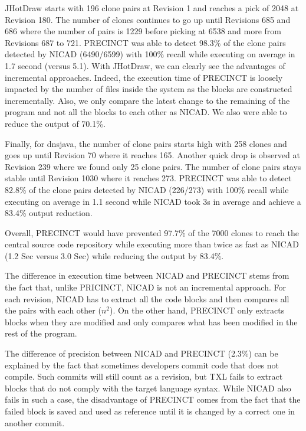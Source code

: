 \documentclass[conference]{IEEEtran}
\begin{document}
JHotDraw starts with 196 clone pairs at Revision 1 and reaches a pick of 2048 at Revision 180. The number of clones  continues to go up until Revisions 685 and 686 where the number of pairs is 1229 before picking at 6538 and more from Revisions 687 to 721.
PRECINCT was able to detect 98.3\% of the clone pairs detected by NICAD (6490/6599) with 100\% recall while executing on average in 1.7 second (versus 5.1).
With JHotDraw, we can clearly see the advantages of incremental approaches.
Indeed, the execution time of PRECINCT is loosely impacted by the number of files inside the system as the blocks are constructed incrementally.
Also, we only compare the latest change to the remaining of the program and not all the blocks to each other as NICAD.
We also were able to reduce the output of 70.1\%.

Finally, for dnsjava, the number of clone pairs starts high with 258 clones and goes up until Revision 70 where it reaches 165. Another quick drop is observed at Revision 239 where we found only 25 clone pairs. The number of clone pairs stays stable until Revision 1030 where it reaches 273. PRECINCT was able to detect 82.8\% of the clone pairs detected by NICAD (226/273) with 100\% recall while executing on average in 1.1 second while NICAD took 3s in average and achieve a 83.4\% output reduction.

Overall, PRECINCT would have prevented 97.7\% of the 7000 clones to reach the central source code repository while executing more than twice as fast as NICAD (1.2 Sec versus 3.0 Sec) while reducing the output by 83.4\%.

The difference in execution time between NICAD and PRECINCT stems from the fact that, unlike PRICINCT, NICAD is not an incremental approach. For each revision, NICAD has to extract all the code blocks and then compares all the pairs with each other ($n^2$). On the other hand, PRECINCT only extracts blocks when they are modified and only compares what has been modified in the rest of the program.

The difference of precision between NICAD and PRECINCT (2.3\%)  can be explained by the fact that sometimes developers commit code that does not compile.
Such commits will still count as a revision, but TXL fails to extract blocks that do not comply with the target language syntax.
While NICAD also fails in such a case, the disadvantage of PRECINCT comes from the fact that the failed block is saved and used as reference until it is changed by a correct one in another commit.
\end{document}
